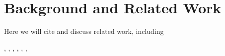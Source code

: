\section{Background and Related Work}
\label{sxn:background}




Here we will cite and discuss related work, including


\cite{MM17_TR},
\cite{MM18_TR},
\cite{MM19_HTSR_ICML},
\cite{weightwatcher_package}
\cite{MM19_KDD},
\cite{MM20_SDM},
\cite{MM20_unpub_work},

